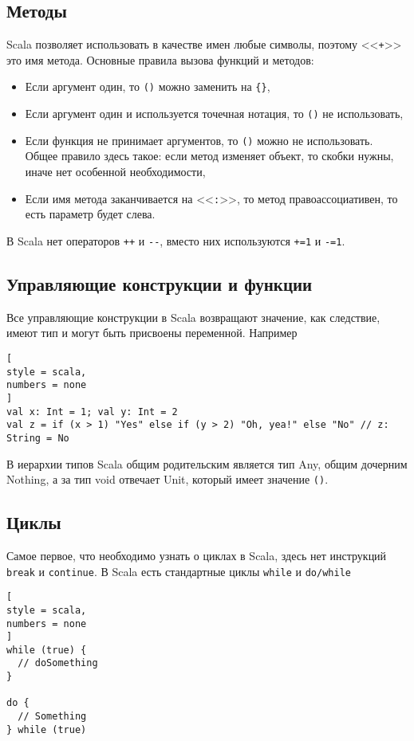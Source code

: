 \documentclass[%
	11pt,
	a4paper,
	utf8,
		]{article}
\begin{document}
\subsection{Методы}

Scala позволяет использовать в качестве имен любые символы, поэтому <<\texttt{+}>> это имя метода. Основные правила вызова функций и методов:
\begin{itemize}
	\item Если аргумент один, то \verb|()| можно заменить на \verb|{}|,
	
	\item Если аргумент один и используется точечная нотация, то \verb|()| не использовать,
	
	\item Если функция не принимает аргументов, то \verb|()| можно не использовать. Общее правило здесь такое: если метод изменяет объект, то скобки нужны, иначе нет особенной необходимости,
	
	\item Если имя метода заканчивается на <<\texttt{:}>>, то метод правоассоциативен, то есть параметр будет слева.
\end{itemize}

В Scala нет операторов \verb|++| и \verb|--|, вместо них используются \verb|+=1| и \verb|-=1|.

\subsection{Управляющие конструкции и функции}

Все управляющие конструкции в Scala возвращают значение, как следствие, имеют тип и могут быть присвоены переменной. Например
\begin{lstlisting}[
style = scala,
numbers = none
]
val x: Int = 1; val y: Int = 2
val z = if (x > 1) "Yes" else if (y > 2) "Oh, yea!" else "No" // z: String = No
\end{lstlisting}

В иерархии типов Scala общим родительским является тип Any, общим дочерним Nothing, а за тип void отвечает Unit, который имеет значение \texttt{()}.

\subsection{Циклы}

Самое первое, что необходимо узнать о циклах в Scala, здесь нет инструкций \texttt{break} и \texttt{continue}. В Scala есть стандартные циклы \texttt{while} и \texttt{do/while}
\begin{lstlisting}[
style = scala,
numbers = none
]
while (true) {
  // doSomething
}

do {
  // Something
} while (true)
\end{lstlisting}
\end{document}
